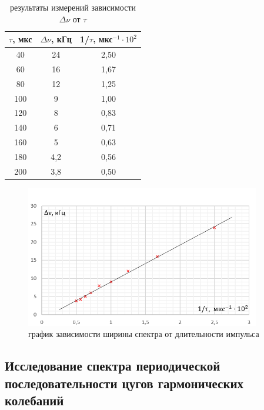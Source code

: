 \documentclass[a4paper]{article}
\theoremstyle{definition}
\theoremstyle{remark}
\begin{document}
\begin{table}[h!]
    \centering
    \caption{результаты измерений зависимости $\Delta\nu$ от $\tau$}
    \begin{tabular}{|c|c|c|}
    \hline
    $\tau$, мкс & $\Delta\nu$, кГц & 1/$\tau$, мкс$^{-1} \cdot 10^2$ \\ \hline
    40          & 24                & 2,50                            \\ \hline
    60          & 16                & 1,67                            \\ \hline
    80          & 12                & 1,25                            \\ \hline
    100         & 9                 & 1,00                            \\ \hline
    120         & 8                 & 0,83                            \\ \hline
    140         & 6                 & 0,71                            \\ \hline
    160         & 5                 & 0,63                            \\ \hline
    180         & 4,2               & 0,56                            \\ \hline
    200         & 3,8               & 0,50                            \\ \hline
    \end{tabular}
    \end{table}

    \begin{figure}[h!]
        \centering
        \includegraphics[width = 290pt]{image/graph1.png}
        \caption{график зависимости ширины спектра от длительности импульса}
    \end{figure}


\newpage

\subsection{Исследование спектра периодической последовательности цугов гармонических колебаний}
\end{document}
